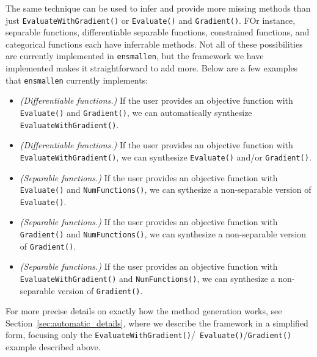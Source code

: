The same technique can be used to infer and provide more missing methods than
just {\tt EvaluateWithGradient()} or {\tt Evaluate()} and {\tt Gradient()}.  FOr
instance, separable functions, differentiable separable functions, constrained
functions, and categorical functions each have inferrable methods.  Not all of
these possibilities are currently implemented in {\tt ensmallen}, but the
framework we have implemented makes it straightforward to add more.  Below are a
few examples that {\tt ensmallen} currently implements:

\begin{itemize}
  \item {\it (Differentiable functions.)}  If the user provides an objective
function with {\tt Evaluate()} and {\tt Gradient()}, we can automatically
synthesize {\tt EvaluateWithGradient()}.

  \item {\it (Differentiable functions.)}  If the user provides an objective
function with {\tt EvaluateWithGradient()}, we can synthesize {\tt Evaluate()}
and/or {\tt Gradient()}.

  \item {\it (Separable functions.)}  If the user provides an objective
function with {\tt Evaluate()} and {\tt NumFunctions()}, we can sythesize a
non-separable version of {\tt Evaluate()}.

  \item {\it (Separable functions.)}  If the user provides an objective function
with {\tt Gradient()} and {\tt NumFunctions()}, we can synthesize a
non-separable version of {\tt Gradient()}.

  \item {\it (Separable functions.)}  If the user provides an objective
function with {\tt EvaluateWithGradient()} and {\tt NumFunctions()}, we can
synthesize a non-separable version of {\tt Gradient()}.
\end{itemize}

For more precise details on exactly how the method generation works, see
Section~\ref{sec:automatic_details}, where we describe the framework in a
simplified form, focusing only the {\tt EvaluateWithGradient()}/{\tt
Evaluate()}/{\tt Gradient()} example described above.
